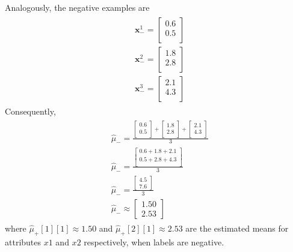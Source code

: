 \documentclass[leqno]{article}
\begin{document}
\noindent Analogously, the negative examples are
\begin{gather*}
\begin{split}
&\textbf{x}_-^1 = 
 \begin{bmatrix}
   0.6 \\
   0.5 \\
 \end{bmatrix}\\
&\textbf{x}_-^2 = 
 \begin{bmatrix}
   1.8 \\
   2.8 \\
\end{bmatrix}\\
&\textbf{x}_-^3 = 
 \begin{bmatrix}
   2.1 \\
   4.3\\
 \end{bmatrix}
\end{split}
\end{gather*}
Consequently,
\begin{gather*}
\begin{split}
&\hat{\mu}_- = 
 \frac{ \begin{bmatrix}
   0.6 \\
   0.5\\ 
 \end{bmatrix} +  \begin{bmatrix}
   1.8 \\
   2.8\\ 
 \end{bmatrix} +  \begin{bmatrix}
   2.1\\
   4.3\\
 \end{bmatrix}}{3}\\
&\hat{\mu}_- = 
 \frac{\begin{bmatrix}
   0.6 + 1.8 + 2.1\\
   0.5 + 2.8 + 4.3\\ 
   \end{bmatrix}}{3}\\
&\hat{\mu}_- = 
 \frac{\begin{bmatrix}
   4.5\\
   7.6 
   \end{bmatrix}}{3}\\
&\hat{\mu}_- \approx 
\begin{bmatrix}
   1.50\\
   2.53 
   \end{bmatrix}
\end{split}
\end{gather*}
where $\hat{\mu}_+[1][1] \approx 1.50$ and $\hat{\mu}_+[2][1] \approx 2.53$ are the estimated means for attributes $x1$ and $x2$ respectively, when labels are negative.
\end{document}
